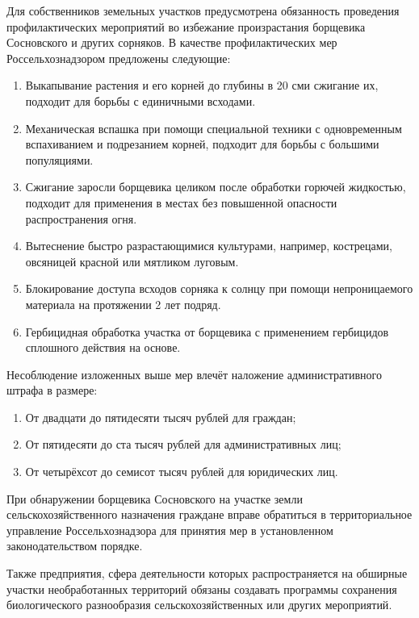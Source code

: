 \nwln
Для собственников земельных участков предусмотрена обязанность проведения профилактических мероприятий во избежание произрастания борщевика Сосновского и других сорняков\cite{rural-measures}.
В качестве профилактических мер Россельхознадзором\cite{countryside-measures} предложены следующие:
\begin{enumerate}[topsep=0pt, parsep=0pt, itemsep=0pt, leftmargin=*, labelindent=0.5cm]
	\item Выкапывание растения и его корней до глубины в 20 сми сжигание их, подходит для борьбы с единичными всходами.
	\item Механическая вспашка при помощи специальной техники с одновременным вспахиванием и подрезанием корней, подходит для борьбы с большими популяциями.
	\item Сжигание заросли борщевика целиком после обработки горючей жидкостью, подходит для применения в местах без повышенной опасности распространения огня.
	\item Вытеснение быстро разрастающимися культурами, например, кострецами, овсяницей красной или мятликом луговым.
	\item Блокирование доступа всходов сорняка к солнцу при помощи непроницаемого материала на протяжении 2 лет подряд.
	\item Гербицидная обработка участка от борщевика с применением гербицидов сплошного действия на основе.
\end{enumerate}

\nwln
Несоблюдение изложенных выше мер влечёт наложение административного штрафа\cite{rural-fine} в размере:
\begin{enumerate}[topsep=0pt, parsep=0pt, itemsep=0pt, leftmargin=*, labelindent=0.5cm]
	\item От двадцати до пятидесяти тысяч рублей для граждан;
	\item От пятидесяти до ста тысяч рублей для административных лиц;
	\item От четырёхсот до семисот тысяч рублей для юридических лиц.
\end{enumerate}

\nwln
При обнаружении борщевика Сосновского на участке земли сельскохозяйственного назначения\cite{rural-law} граждане вправе обратиться в территориальное управление Россельхознадзора для принятия мер в установленном законодательством порядке.

\nwln
Также предприятия, сфера деятельности которых распространяется на обширные участки необработанных территорий обязаны создавать программы сохранения биологического разнообразия сельскохозяйственных или других мероприятий\cite{nature-law}.

